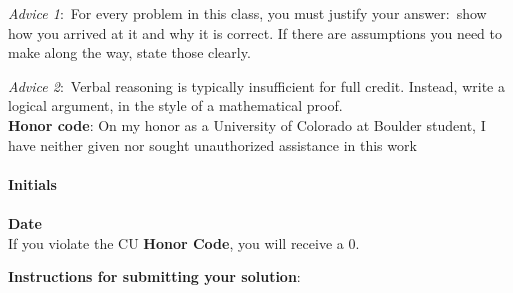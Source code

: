 \documentclass[12pt]{article}
\begin{document}
\renewcommand{\headrulewidth}{0.5pt}

\phantom{Test}

\begin{small}
\textit{Advice 1}:\ For every problem in this class, you must justify your answer:\ show how you arrived at it and why it is correct. If there are assumptions you need to make along the way, state those clearly.

\textit{Advice 2}:\ Verbal reasoning is typically insufficient for full credit. Instead, write a logical argument, in the style of a mathematical proof.\\

\textbf{Honor code}: On my honor as a University of Colorado at Boulder student,
I have neither given nor sought unauthorized assistance in this work\\  \\
\textbf{Initials} 
 \\ \\
\textbf{Date} 
 \\ 


If you violate the CU \textbf{Honor Code}, you will receive a 0.

\textbf{Instructions for submitting your solution}:
\vspace{-5mm} 


\end{small}
\end{document}

